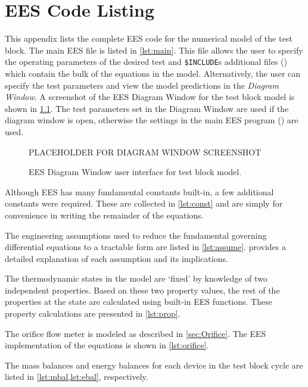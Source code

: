 \chapter{EES Code Listing} \label{app:code}

This appendix lists the complete EES code for the numerical model of the test block.
The main EES file is listed in \cref{lst:main}. This file allows the user to specify
the operating parameters of the desired test and \verb+$INCLUDE+s additional files
() which contain 
the bulk of the equations in the model. 
Alternatively, the user can specify the test parameters and view the model 
predictions in the \emph{Diagram Window}. A screenshot of the EES Diagram Window 
for the test block model is shown in \cref{fig:DiagWindow}. The test parameters
set in the Diagram Window are used if the diagram window is open, otherwise the
settings in the main EES program () are used.
\begin{figure}[htbp]
	\centering
	PLACEHOLDER FOR DIAGRAM WINDOW SCREENSHOT
	\caption{EES Diagram Window user interface for test block model.}
	\label{fig:DiagWindow}
\end{figure}

Although EES has many fundamental constants built-in, a few additional constants
were required. These are collected in \cref{lst:const} and are simply for convenience
in writing the remainder of the equations.


The engineering assumptions used to reduce the fundamental governing differential
equations to a tractable form are listed in \cref{lst:assume}. 
provides a detailed explanation of each assumption and its implications.


The thermodynamic states in the model are `fixed' by knowledge of two independent
properties. Based on these two property values, the rest of the properties at the
state are calculated using built-in EES functions. These property calculations are
presented in \cref{lst:prop}. 


The orifice flow meter is modeled as described in \cref{sec:Orifice}. The EES
implementation of the equations is shown in \cref{lst:orifice}.

The mass balances and energy balances for each device in the test block cycle
are listed in \cref{lst:mbal,lst:ebal}, respectively.

